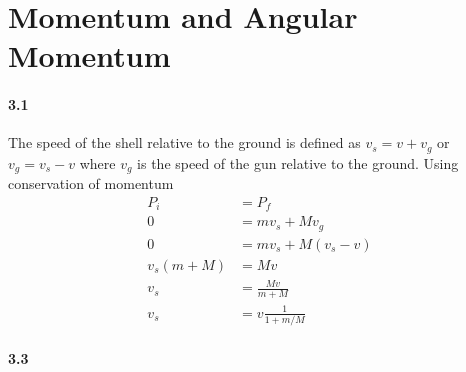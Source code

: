 \documentclass[../problems.tex]{subfiles}
\begin{document}
\section{Momentum and Angular Momentum}
\barh 

\paragraph{3.1}

The speed of the shell relative to the ground is defined as $v_s=v + v_g$  or $v_g = v_s - v$ where
$v_g$ is the speed of the gun relative to the ground. Using conservation of momentum
\begin{align*}
    P_i &= P_f \\
    0 &= mv_s + Mv_g \\
    0 &= mv_s + M(v_s - v) \\
    v_s(m + M) &= Mv \\
    v_s &= \frac{Mv}{m + M} \\
    v_s &= v \frac{1}{1 + m/M}
\end{align*}

\paragraph{3.3}
\end{document}
